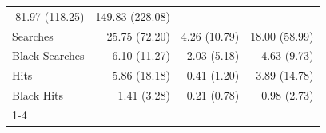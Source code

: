 \begin{table}[!h]
\begin{tabular}{llll}
  \multicolumn{1}{r}{81.97 (118.25)} &
  \multicolumn{1}{r}{149.83 (228.08)} \\
\multicolumn{1}{l}{\hspace{1em}Searches} &
  \multicolumn{1}{r}{25.75 (72.20)} &
  \multicolumn{1}{r}{4.26 (10.79)} &
  \multicolumn{1}{r}{18.00 (58.99)} \\
\multicolumn{1}{l}{\hspace{1em}Black Searches} &
  \multicolumn{1}{r}{6.10 (11.27)} &
  \multicolumn{1}{r}{2.03 (5.18)} &
  \multicolumn{1}{r}{4.63 (9.73)} \\
\multicolumn{1}{l}{\hspace{1em}Hits} &
  \multicolumn{1}{r}{5.86 (18.18)} &
  \multicolumn{1}{r}{0.41 (1.20)} &
  \multicolumn{1}{r}{3.89 (14.78)} \\
\multicolumn{1}{l}{\hspace{1em}Black Hits} &
  \multicolumn{1}{r}{1.41 (3.28)} &
  \multicolumn{1}{r}{0.21 (0.78)} &
  \multicolumn{1}{r}{0.98 (2.73)} \\
\cline{1-4}
\end{tabular}
\end{table}
